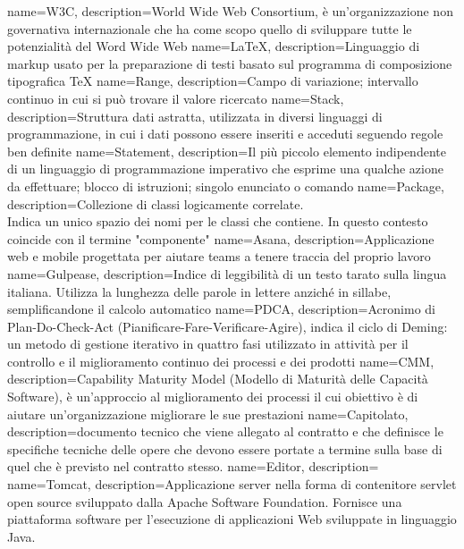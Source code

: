  {
	name=W3C,
	description={World Wide Web Consortium, è un'organizzazione non governativa internazionale che ha come scopo quello di
	sviluppare tutte le potenzialità del Word Wide Web}
}
 {
	name=LaTeX,
	description={Linguaggio di markup usato per la preparazione di testi basato sul programma di composizione tipografica
	TeX}
}
 {
	name=Range,
	description={Campo di variazione; intervallo continuo in cui si può trovare il valore ricercato}
}
 {
	name=Stack,
	description={Struttura dati astratta, utilizzata in diversi linguaggi di programmazione, in cui i dati possono essere
	inseriti e acceduti seguendo regole ben definite}
}
 {
	name=Statement,
	description={Il più piccolo elemento indipendente di un linguaggio di programmazione imperativo che esprime una qualche
	azione da effettuare; blocco di istruzioni; singolo enunciato o comando}
}
 {
	name=Package,
	description={Collezione di classi logicamente correlate. \\
	Indica un unico spazio dei nomi per le classi che contiene. In questo contesto coincide con il termine "componente"}
}
 {
	name=Asana,
	description={Applicazione web e mobile progettata per aiutare teams a tenere traccia del proprio lavoro}
}
 {
	name=Gulpease,
	description={Indice di leggibilità di un testo tarato sulla lingua italiana. Utilizza la lunghezza delle parole in
	lettere anziché in sillabe, semplificandone il calcolo automatico}
}
 {
	name=PDCA,
	description={Acronimo di Plan-Do-Check-Act (Pianificare-Fare-Verificare-Agire), indica il ciclo di Deming: un metodo di
	gestione iterativo in quattro fasi utilizzato in attività per il controllo e il miglioramento continuo dei processi e
	dei prodotti}
}
 {
	name=CMM,
	description={Capability Maturity Model (Modello di Maturità delle Capacità Software), è un'approccio al miglioramento
	dei processi il cui obiettivo è di aiutare un'organizzazione migliorare le sue prestazioni}
}
 {
	name=Capitolato,
	description={documento tecnico che viene allegato al contratto e che definisce le specifiche tecniche delle opere che devono essere portate a termine sulla base di quel che è previsto nel contratto stesso.}
}
 {
	name=Editor,
	description={}
}
 {
	name=Tomcat,
	description={Applicazione server nella forma di contenitore servlet open source sviluppato dalla Apache Software Foundation. Fornisce una piattaforma software per l'esecuzione di applicazioni Web sviluppate in linguaggio Java. }
}

